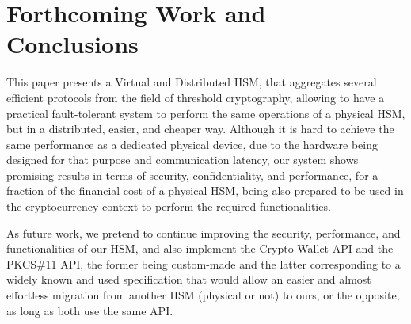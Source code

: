 \documentclass[runningheads]{llncs}
\begin{document}
\section{Forthcoming Work and Conclusions} \label{sec:conclusions}
This paper presents a Virtual and Distributed HSM, that aggregates several efficient protocols from the field of threshold cryptography, allowing to have a practical fault-tolerant system to perform the same operations of a physical HSM, but in a distributed, easier, and cheaper way. Although it is hard to achieve the same performance as a dedicated physical device, due to the hardware being designed for that purpose and communication latency, our system shows promising results in terms of security, confidentiality, and performance, for a fraction of the financial cost of a physical HSM, being also prepared to be used in the cryptocurrency context to perform the required functionalities. %

As future work, we pretend to continue improving the security, performance, and functionalities of our HSM, and also implement the Crypto-Wallet API and the PKCS\#11 API, the former being custom-made and the latter corresponding to a widely known and used specification that would allow an easier and almost effortless migration from another HSM (physical or not) to ours, or the opposite, as long as both use the same API.








\end{document}
